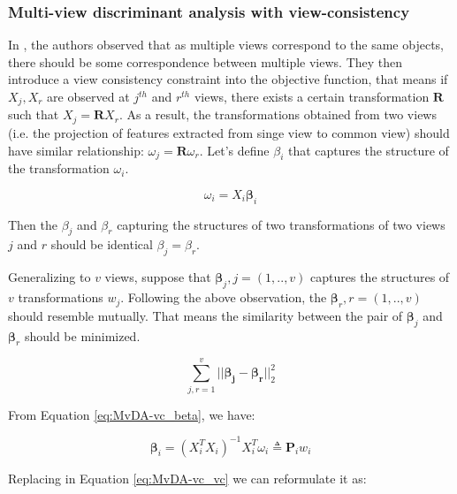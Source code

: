     \subsubsection{Multi-view discriminant analysis with view-consistency}

        In \cite{kan2016multi}, the authors observed that as multiple views correspond to the same objects, there should be some correspondence between multiple views.
        They then introduce a view consistency constraint into the objective function, that means if $X_j, X_r$ are observed at $j^{th}$ and $r^{th}$ views, there exists a certain transformation $\boldsymbol{R}$ such that $X_j = \boldsymbol{R}X_r$.
        As a result, the transformations obtained from two views (i.e. the projection of features extracted from singe view to common view) should have similar relationship: ${\omega}_j = \boldsymbol{R}{\omega}_r$.
        Let's define $\beta_i$ that captures the structure of the transformation ${\omega}_i$.

        \begin{equation}
            \omega_i = X_i\boldsymbol\beta_i
            \label{eq:MvDA-vc_beta}
        \end{equation}

        Then the $\beta_j$ and $\beta_r$ capturing the structures of two transformations of two views $j$ and $r$ should be identical ${\beta}_j = {\beta}_r$.

        Generalizing to $v$ views, suppose that ${\boldsymbol\beta}_j, j=(1,..,v)$ captures the structures of $v$ transformations ${w}_j$.
        Following the above observation, the $\boldsymbol{\beta}_r, r=(1,..,v)$ should resemble mutually.
        That means the similarity between the pair of $\boldsymbol{\beta}_j$ and $\boldsymbol{\beta}_r$ should be minimized. 

        \begin{equation}
            \sum_{j,r=1}^{v}||\boldsymbol{\beta_j} - \boldsymbol{\beta_r}||_2^2
            \label{eq:MvDA-vc_vc}
        \end{equation}

        From Equation \eqref{eq:MvDA-vc_beta}, we have:

        \begin{equation}
            \boldsymbol\beta_i = {\left(X_i^{T}X_i\right)}^{-1}X_i^{T}\omega_i \triangleq \boldsymbol{P}_iw_i
        \end{equation}

        Replacing in Equation \eqref{eq:MvDA-vc_vc} we can reformulate it as:


